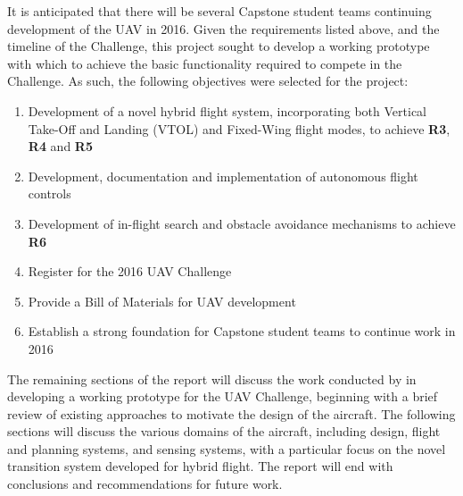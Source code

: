 It is anticipated that there will be several Capstone student teams continuing development of the UAV in 2016. Given the requirements listed above, and the timeline of the Challenge, this project sought to develop a working prototype with which to achieve the basic functionality required to compete in the Challenge. As such, the following objectives were selected for the project:
\begin{enumerate}[label=\bfseries O\arabic*:] \itemsep-2pt
	\item Development of a novel hybrid flight system, incorporating both Vertical Take-Off and Landing (VTOL) and Fixed-Wing flight modes, to achieve \textbf{R3}, \textbf{R4} and \textbf{R5}
	\item Development, documentation and implementation of autonomous flight controls
	\item Development of in-flight search and obstacle avoidance mechanisms to achieve \textbf{R6}
	\item Register for the 2016 UAV Challenge
	\item Provide a Bill of Materials for UAV development
	\item Establish a strong foundation for Capstone student teams to continue work in 2016
\end{enumerate}

The remaining sections of the report will discuss the work conducted by \ID in developing a working prototype for the UAV Challenge, beginning with a brief review of existing approaches to motivate the design of the aircraft. The following sections will discuss the various domains of the aircraft, including design, flight and planning systems, and sensing systems, with a particular focus on the novel transition system developed for hybrid flight. The report will end with conclusions and recommendations for future work.